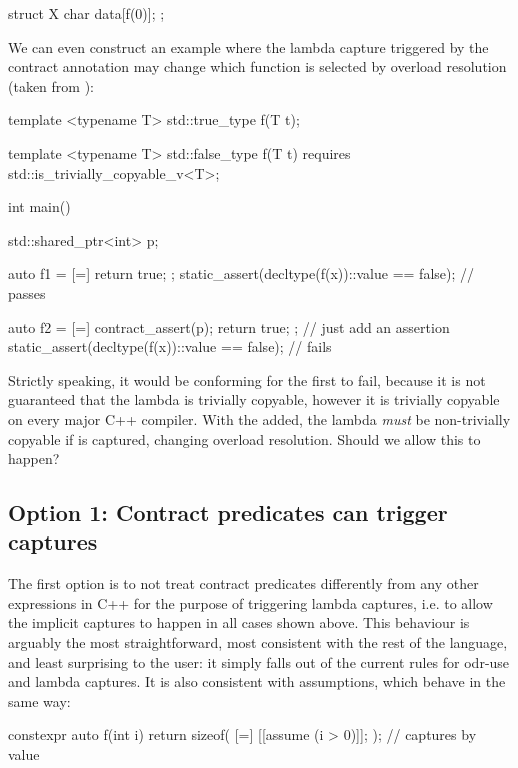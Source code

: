 \begin{codeblock}
struct X {
  char data[f(0)];
};
\end{codeblock}

We can even construct an example where the lambda capture triggered by the contract annotation may change which function is selected by overload resolution (taken from \cite{P2932R2}):

\begin{codeblock}
template <typename T>
std::true_type f(T t);

template <typename T>
std::false_type f(T t)
requires std::is_trivially_copyable_v<T>;

int main() {
    std::shared_ptr<int> p;
    
    auto f1 = [=]{ return true; };
    static_assert(decltype(f(x))::value == false);      // passes
    
    auto f2 = [=]{ contract_assert(p); return true; };  // just add an assertion
    static_assert(decltype(f(x))::value == false);      // fails
}

\end{codeblock}

Strictly speaking, it would be conforming for the first  to fail, because it is not guaranteed that the lambda is trivially copyable, however it is trivially copyable on every major C++ compiler. With the  added, the lambda \emph{must} be non-trivially copyable if  is captured, changing overload resolution. Should we allow this to happen?

\subsection*{Option 1: Contract predicates can trigger captures}

The first option is to not treat contract predicates differently from any other expressions in C++ for the purpose of triggering lambda captures, i.e. to allow the implicit captures to happen in all cases shown above. This behaviour is arguably the most straightforward, most consistent with the rest of the language, and least surprising to the user: it simply falls out of the current rules for odr-use and lambda captures. It is also consistent with assumptions, which behave in the same way:

\begin{codeblock}
constexpr auto f(int i) {
  return sizeof( [=] { [[assume (i > 0)]]; } );   // captures  by value
}
\end{codeblock}

